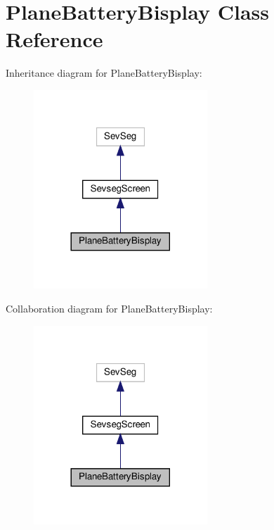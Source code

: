\hypertarget{class_plane_battery_bisplay}{}\section{Plane\+Battery\+Bisplay Class Reference}
\label{class_plane_battery_bisplay}


Inheritance diagram for Plane\+Battery\+Bisplay\+:\nopagebreak
\begin{figure}[H]
\begin{center}
\leavevmode
\includegraphics[width=185pt]{class_plane_battery_bisplay__inherit__graph}
\end{center}
\end{figure}


Collaboration diagram for Plane\+Battery\+Bisplay\+:\nopagebreak
\begin{figure}[H]
\begin{center}
\leavevmode
\includegraphics[width=185pt]{class_plane_battery_bisplay__coll__graph}
\end{center}
\end{figure}
